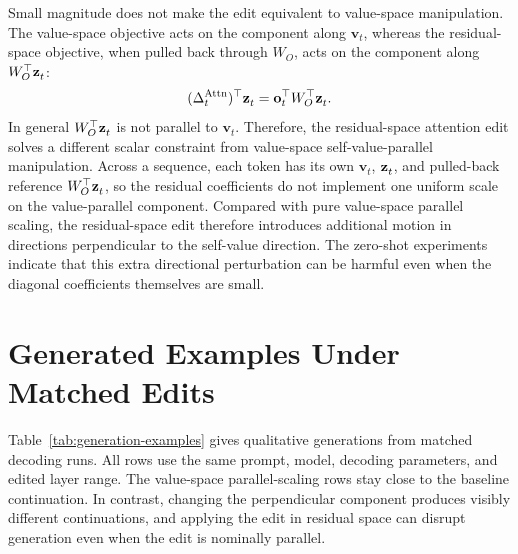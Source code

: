 Small magnitude does not make the edit equivalent to value-space manipulation. The
value-space objective acts on the component along \(\mathbf{v}_t\), whereas the
residual-space objective, when pulled back through \(W_O\), acts on the
component along \(W_O^\top\mathbf{z}^{}_{t}\):
\[
  (\Delta_t^{\mathrm{Attn}})^\top\mathbf{z}^{}_{t}
  =
  \mathbf{o}_t^\top W_O^\top\mathbf{z}^{}_{t}.
\]
In general \(W_O^\top\mathbf{z}^{}_{t}\) is not parallel to \(\mathbf{v}_t\). Therefore,
the residual-space attention edit solves a different scalar constraint from
value-space self-value-parallel manipulation. Across a sequence, each token
has its own \(\mathbf{v}_t\), \(\mathbf{z}^{}_{t}\), and pulled-back reference
\(W_O^\top\mathbf{z}^{}_{t}\), so the residual coefficients do not implement one
uniform scale on the value-parallel component. Compared with pure
value-space parallel scaling, the residual-space edit therefore introduces
additional motion in directions perpendicular to the self-value direction. The
zero-shot experiments indicate that this extra directional perturbation can be
harmful even when the diagonal coefficients themselves are small.

\clearpage
\section{Generated Examples Under Matched Edits}
\label{app:generation-examples}

Table~\ref{tab:generation-examples} gives qualitative generations from matched
decoding runs. All rows use the same prompt, model, decoding parameters, and
edited layer range. The value-space parallel-scaling rows stay close to the
baseline continuation. In contrast, changing the perpendicular component
produces visibly different continuations, and applying the edit in residual
space can disrupt generation even when the edit is nominally parallel.

